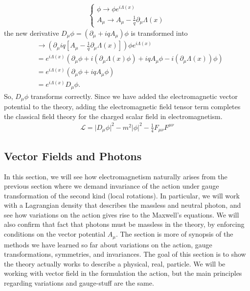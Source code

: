\documentclass[a4paper,11pt]{article}
\numberwithin{equation}{section}
\theoremstyle{definition}
\newcommand{\p}{\partial}
\newcommand{\lag}{\mathcal{L}}
\begin{document}
\begin{align*}
\begin{cases}
\phi \to \phi e^{i\Lambda(x)}\\
A_\mu \to A_\mu - \frac{1}{q}\p_\mu\Lambda(x)
\end{cases}
\end{align*}
the new derivative $D_\mu\phi = (\p_\mu + iqA_\mu)\phi$ is transformed into
\begin{align*}
&\to \left( \p_\mu  iq\left[ A_\mu -\frac{1}{q}\p_\mu\Lambda(x)  \right] \right)\phi e^{i\Lambda(x)}\\
&= e^{i\Lambda(x)}\left( \p_\mu\phi + i(\p_\mu\Lambda(x)\phi) + iqA_\mu \phi - i(\p_\mu \Lambda(x))\phi \right)\\
&= e^{i\Lambda(x)}(\p_\mu \phi + iqA_\mu\phi)\\
&= e^{i\Lambda(x)}D_\mu\phi.
\end{align*}
So, $D_\mu\phi$ transforms correctly. Since we have added the electromagnetic vector potential to the theory, adding the electromagnetic field tensor term completes the classical field theory for the charged scalar field in electromagnetism. 
\begin{align*}
\boxed{\lag = \vert D_\mu \phi\vert^2 - m^2\vert \phi\vert^2 - \frac{1}{4}F_{\mu\nu}F^{\mu\nu} }
\end{align*}


\subsection{Vector Fields and Photons}

In this section, we will see how electromagnetism naturally arises from the previous section where we demand invariance of the action under gauge transformation of the second kind (local rotations). In particular, we will work with a Lagrangian density that describes the massless and neutral photon, and see how variations on the action gives rise to the Maxwell's equations. We will also confirm that fact that photons must be massless in the theory, by enforcing conditions on the vector potential $A_\mu$. The section is more of synopsis of the methods we have learned so far about variations on the action, gauge transformations, symmetries, and invariances. The goal of this section is to show the theory actually works to describe a physical, real, particle. We will be working with vector field in the formulation the action, but the main principles regarding variations and gauge-stuff are the same.  \\
\end{document}
